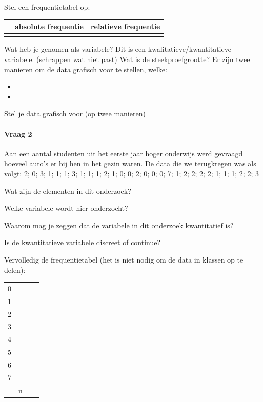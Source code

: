 \documentclass[12pt,twoside]{article}
\begin{document}
Stel een frequentietabel op:
\begin{center}
  \begin{tabular}{p{4cm}|p{4cm}|p{4cm}}
    &absolute frequentie&relatieve frequentie\\
    \hline
    &&\\[6cm]
  \end{tabular}
\end{center}

Wat heb je genomen als variabele? \arulefill
Dit is een kwalitatieve/kwantitatieve variabele. {\tiny (schrappen wat niet past)}
Wat is de steekproefgrootte? \arulefill
Er zijn twee manieren om de data grafisch voor te stellen, welke:
\begin{itemize}
  \item \arule{6cm}
  \item \arule{6cm}
\end{itemize}

\newpage
Stel je data grafisch voor (op twee manieren)

\ruitjes{20cm}

\newpage
\paragraph{Vraag 2}
Aan een aantal studenten uit het eerste jaar hoger onderwijs werd gevraagd hoeveel auto's er bij hen in het gezin waren. De data die we terugkregen was als volgt:
2; 0; 3; 1; 1; 1; 3; 1; 1; 1; 2; 1; 0; 0; 2; 0; 0; 0; 7; 1; 2; 2; 2; 2; 1; 1; 1; 2; 2; 3

Wat zijn de elementen in dit onderzoek?

Welke variabele wordt hier onderzocht?

Waarom mag je zeggen dat de variabele in dit onderzoek kwantitatief is?

Is de kwantitatieve variabele discreet of continue?

Vervolledig de frequentietabel (het is niet nodig om de data in klassen op te delen):
\begin{center}
  \setlength{\tabcolsep}{7pt}
  \renewcommand{\arraystretch}{1.5}
  \begin{tabular}{p{4cm}|p{4cm}|p{4cm}}
    &&\\
    \hline
    0&&\\
    1&&\\
    2&&\\
    3&&\\
    4&&\\
    5&&\\
    6&&\\
    7&&\\
    &n=&\\
  \end{tabular}
\end{center}
\end{document}
